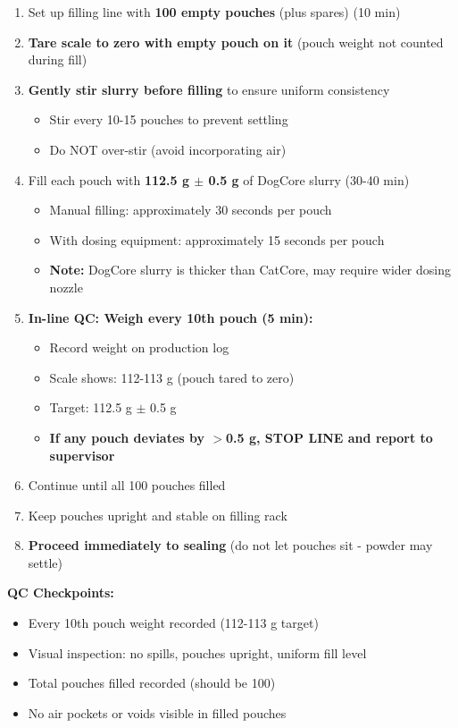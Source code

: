 \vspace{0.5em}

\begin{enumerate}[leftmargin=1.5em]
\item Set up filling line with \textbf{100 empty pouches} (plus spares) (10 min)
\item \textbf{Tare scale to zero with empty pouch on it} (pouch weight not counted during fill)
\item \textbf{Gently stir slurry before filling} to ensure uniform consistency
  \begin{itemize}
  \item Stir every 10-15 pouches to prevent settling
  \item Do NOT over-stir (avoid incorporating air)
  \end{itemize}
\item Fill each pouch with \textbf{112.5 g $\pm$ 0.5 g} of DogCore slurry (30-40 min)
  \begin{itemize}
  \item Manual filling: approximately 30 seconds per pouch
  \item With dosing equipment: approximately 15 seconds per pouch
  \item \textbf{Note:} DogCore slurry is thicker than CatCore, may require wider dosing nozzle
  \end{itemize}
\item \textbf{In-line QC: Weigh every 10th pouch (5 min):}
  \begin{itemize}
  \item Record weight on production log
  \item Scale shows: 112-113 g (pouch tared to zero)
  \item Target: 112.5 g $\pm$ 0.5 g
  \item \textbf{If any pouch deviates by $>$0.5 g, STOP LINE and report to supervisor}
  \end{itemize}
\item Continue until all 100 pouches filled
\item Keep pouches upright and stable on filling rack
\item \textbf{Proceed immediately to sealing} (do not let pouches sit - powder may settle)
\end{enumerate}

\textbf{QC Checkpoints:}
\begin{itemize}
\item Every 10th pouch weight recorded (112-113 g target)
\item Visual inspection: no spills, pouches upright, uniform fill level
\item Total pouches filled recorded (should be 100)
\item No air pockets or voids visible in filled pouches
\end{itemize}

